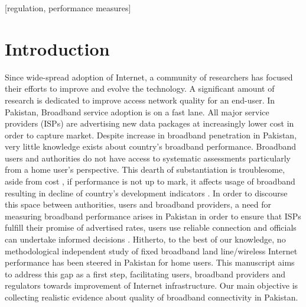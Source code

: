 \documentclass{sig-alternate-10pt}
\begin{document}
[regulation, performance measures]



\section{Introduction}
\indent Since wide-spread adoption of Internet, a community of researchers has focused their efforts to improve and evolve the technology. A significant amount of research is dedicated to improve access network quality for an end-user. In Pakistan, Broadband service adoption is on a fast lane. All major service providers (ISPs) are advertising new data packages at increasingly lower cost in order to capture market. Despite increase in broadband penetration in Pakistan, very little knowledge exists about country's broadband performance. Broadband users and authorities do not have access to systematic assessments particularly from a home user's perspective. This dearth of substantiation is troublesome, aside from cost \cite{chetty:cap}, if performance is not up to mark, it affects usage of broadband \cite{10,25}  resulting in decline of country's development indicators \cite {24}. In order to discourse this space between authorities, users and broadband providers, a need for measuring broadband performance arises in Pakistan in order to ensure that ISPs fulfill their promise of advertised rates, users use reliable connection and officials can undertake informed decisions \cite{12,15,16}. Hitherto, to the best of our knowledge, no methodological independent study of fixed broadband land line/wireless Internet performance has been steered in Pakistan for home users. This manuscript aims to address this gap as a first step, facilitating users, broadband providers and regulators towards improvement of Internet infrastructure. Our main objective is collecting realistic evidence about quality of broadband connectivity in Pakistan.
\end{document}
